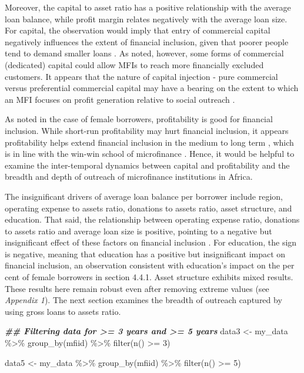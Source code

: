 \documentclass[a4paper,nobind]{templates/ociamthesis}
\newenvironment{Shaded}{\begin{snugshade}}{\end{snugshade}}
\newcommand{\DecValTok}[1]{\textcolor[rgb]{0.00,0.00,0.81}{#1}}
\newcommand{\DocumentationTok}[1]{\textcolor[rgb]{0.56,0.35,0.01}{\textbf{\textit{#1}}}}
\newcommand{\FunctionTok}[1]{\textcolor[rgb]{0.00,0.00,0.00}{#1}}
\newcommand{\NormalTok}[1]{#1}
\newcommand{\OtherTok}[1]{\textcolor[rgb]{0.56,0.35,0.01}{#1}}
\newcommand{\SpecialCharTok}[1]{\textcolor[rgb]{0.00,0.00,0.00}{#1}}
\renewenvironment{Shaded}
{
  \vspace{10pt}%
  \begin{snugshade}%
}{%
  \end{snugshade}%
  \vspace{8pt}%
}
\begin{document}
Moreover, the capital to asset ratio has a positive relationship with the average loan balance, while profit margin relates negatively with the average loan size. For capital, the observation would imply that entry of commercial capital negatively influences the extent of financial inclusion, given that poorer people tend to demand smaller loans \autocite{mersland2010microfinance}. As noted, however, some forms of commercial (dedicated) capital could allow MFIs to reach more financially excluded customers. It appears that the nature of capital injection - pure commercial versus preferential commercial capital may have a bearing on the extent to which an MFI focuses on profit generation relative to social outreach \autocite{d2013unsubsidized}.

As noted in the case of female borrowers, profitability is good for financial inclusion. While short-run profitability may hurt financial inclusion, it appears profitability helps extend financial inclusion in the medium to long term \autocite{louis2013financial,quayes2012depth}, which is in line with the win-win school of microfinance \autocite{kodongo2013individual}. Hence, it would be helpful to examine the inter-temporal dynamics between capital and profitability and the breadth and depth of outreach of microfinance institutions in Africa.

The insignificant drivers of average loan balance per borrower include region, operating expense to assets ratio, donations to assets ratio, asset structure, and education. That said, the relationship between operating expense ratio, donations to assets ratio and average loan size is positive, pointing to a negative but insignificant effect of these factors on financial inclusion \autocite{d2017ngos}. For education, the sign is negative, meaning that education has a positive but insignificant impact on financial inclusion, an observation consistent with education's impact on the per cent of female borrowers in section 4.4.1. Asset structure exhibits mixed results. These results here remain robust even after removing extreme values (see \emph{Appendix 1}). The next section examines the breadth of outreach captured by using gross loans to assets ratio.

\begin{Shaded}
\begin{Highlighting}[]
\DocumentationTok{\#\# Filtering data for \textgreater{}= 3 years and \textgreater{}= 5 years}
\NormalTok{data3 }\OtherTok{\textless{}{-}}\NormalTok{ my\_data }\SpecialCharTok{\%\textgreater{}\%} \FunctionTok{group\_by}\NormalTok{(mfiid) }\SpecialCharTok{\%\textgreater{}\%} \FunctionTok{filter}\NormalTok{(}\FunctionTok{n}\NormalTok{() }\SpecialCharTok{\textgreater{}=} \DecValTok{3}\NormalTok{)}

\NormalTok{data5 }\OtherTok{\textless{}{-}}\NormalTok{ my\_data }\SpecialCharTok{\%\textgreater{}\%} \FunctionTok{group\_by}\NormalTok{(mfiid) }\SpecialCharTok{\%\textgreater{}\%} \FunctionTok{filter}\NormalTok{(}\FunctionTok{n}\NormalTok{() }\SpecialCharTok{\textgreater{}=} \DecValTok{5}\NormalTok{)}
\end{Highlighting}
\end{Shaded}
\end{document}
